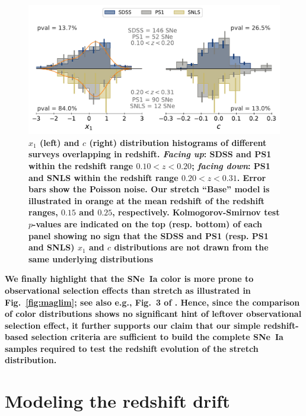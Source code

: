 \documentclass[referee]{aa}
\begin{document}
\begin{figure}
    \centering
    \includegraphics[width=0.95\linewidth]{Article_figures/both-cut_SDSS_SNLS_PS1.pdf}
    \caption{\textbf{$x_1$ (left) and $c$ (right) distribution histograms of
            different surveys overlapping in redshift. \textit{Facing up}: SDSS
            and PS1 within the redshift range $0.10 < z < 0.20$; \textit{facing
            down}: PS1 and SNLS within the redshift range $0.20 < z < 0.31$.
            Error bars show the Poisson noise. Our stretch ``Base'' model is
            illustrated in orange at the mean redshift of the redshift ranges,
            $0.15$ and $0.25$, respectively. Kolmogorov-Smirnov test $p$-values
            are indicated on the top (resp. bottom) of each panel showing no
            sign that the SDSS and PS1 (resp. PS1 and SNLS) $x_1$ and $c$
            distributions are not drawn from the same underlying
    distributions}}
    \label{fig:distrib}
\end{figure}

\textbf{We finally highlight that the SNe~Ia color is more prone to
    observational selection effects than stretch as illustrated in
    Fig.~\ref{fig:maglim}; see also e.g., Fig.~3 of \cite{kessler2017}. Hence,
    since the comparison of color distributions shows no significant hint of
    leftover observational selection effect, it further supports our claim that
    our simple redshift-based selection criteria are sufficient to build the
    complete SNe~Ia samples required to test the redshift evolution of the
stretch distribution.}

\section{Modeling the redshift drift}\label{sec:modeling}
\end{document}
